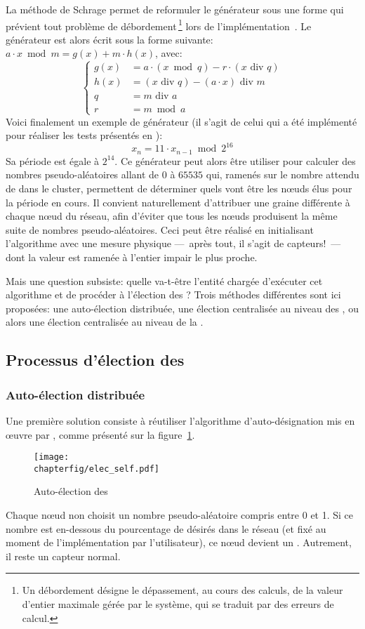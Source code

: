 La méthode de Schrage permet de reformuler le générateur sous une forme qui prévient tout problème de débordement\,\footnote{Un débordement désigne le dépassement, au cours des calculs, de la valeur d'entier maximale gérée par le système, qui se traduit par des erreurs de calcul.} lors de l'implémentation~\cite{RJ91}.
Le générateur est alors écrit sous la forme suivante: $a\cdot x\bmod m=g(x)+m\cdot h(x)$, avec:
\[\left\{
    \begin{aligned}
        g(x) & =a\cdot(x\bmod q)-r\cdot(x\mbox{~div~}q)\\
        h(x) & =(x\mbox{~div~}q)-(a\cdot x)\mbox{~div~}m\\
        q    & =m\mbox{~div~}a\\
        r    & =m\bmod a
    \end{aligned}
\right.\]
Voici finalement un exemple de générateur (il s'agit de celui qui a été implémenté pour réaliser les tests présentés en ):
\[x_n=11\cdot x_{n-1}\bmod2^{16}\]
Sa période est égale à $2^{14}$.
Ce générateur peut alors être utiliser pour calculer des nombres pseudo-aléatoires allant de $0$ à $65535$ qui, ramenés sur le nombre attendu de \cns dans le cluster, permettent de déterminer quels vont être les nœuds élus pour la période en cours.
Il convient naturellement d'attribuer une graine différente à chaque nœud du réseau, afin d'éviter que tous les nœuds produisent la même suite de nombres pseudo-aléatoires.
Ceci peut être réalisé en initialisant l'algorithme avec une mesure physique ---~après tout, il s'agit de capteurs!~--- dont la valeur est ramenée à l'entier impair le plus proche.

Mais une question subsiste: quelle va-t-être l'entité chargée d'exécuter cet algorithme et de procéder à l'élection des \cns?
Trois méthodes différentes sont ici proposées: une auto-élection distribuée, une élection centralisée au niveau des \CH, ou alors une élection centralisée au niveau de la \sdb.
    \subsection{Processus d'élection des \cns}

        \subsubsection{Auto-élection distribuée}
Une première solution consiste à réutiliser l'algorithme d'auto-désignation mis en œuvre par \leach, comme présenté sur la figure~\ref{sa:fig:elecself}.
\begin{figure}[ht]
    \centering
    \texttt{[image: \\chapterfig/elec\_self.pdf]}
    \caption{Auto-élection des \cns}\label{sa:fig:elecself}
\end{figure}
Chaque nœud non \CH choisit un nombre pseudo-aléatoire compris entre 0 et 1.
Si ce nombre est en-dessous du pourcentage de \cns désirés dans le réseau (et fixé au moment de l'implémentation par l'utilisateur), ce nœud devient un \cn.
Autrement, il reste un capteur normal.

